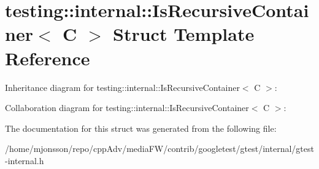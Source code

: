 \hypertarget{structtesting_1_1internal_1_1IsRecursiveContainer}{}\section{testing\+:\+:internal\+:\+:Is\+Recursive\+Container$<$ C $>$ Struct Template Reference}
\label{structtesting_1_1internal_1_1IsRecursiveContainer}


Inheritance diagram for testing\+:\+:internal\+:\+:Is\+Recursive\+Container$<$ C $>$\+:


Collaboration diagram for testing\+:\+:internal\+:\+:Is\+Recursive\+Container$<$ C $>$\+:


The documentation for this struct was generated from the following file\+:\begin{DoxyCompactItemize}
\item 
/home/mjonsson/repo/cpp\+Adv/media\+F\+W/contrib/googletest/gtest/internal/gtest-\/internal.\+h\end{DoxyCompactItemize}
